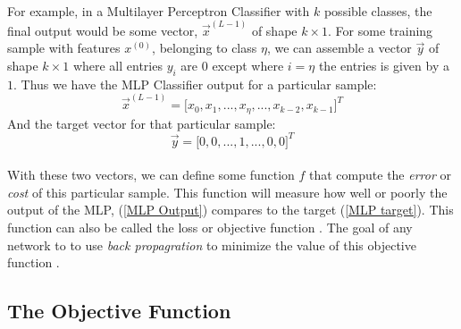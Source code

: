 \documentclass[12pt,letterpaper]{article}
\begin{document}
\paragraph*{}For example, in a Multilayer Perceptron Classifier with $k$ possible classes, the final output would be some vector, $\vec{x}^{(L-1)}$ of shape $k \times 1$. For some training sample with features $x^{(0)}$, belonging to class $\eta$, we can assemble a vector $\vec{y}$ of shape $k \times 1$ where all entries $y_i$ are $0$ except where $i = \eta$ the entries is given by a $1$. Thus we have the MLP Classifier output for a particular sample:
\begin{equation}
\label{MLP Output}
\vec{x}^{(L-1)} = \big[ x_0 , x_1 , ... , x_\eta , ... , 
x_{k-2} , x_{k-1} \big]^T
\end{equation}
And the target vector for that particular sample:
\begin{equation}
\label{MLP target}
\vec{y} = \big[ 0, 0 , ... , 1 , ... , 0 , 0 \big]^T
\end{equation}
\paragraph*{}With these two vectors, we can define some function $f$ that compute the \textit{error} or \textit{cost} of this particular sample. This function will measure how well or poorly the output of the MLP, (\ref{MLP Output}) compares to the target (\ref{MLP target}). This function can also be called the loss or objective function \cite{James}. The goal of any network to to use \textit{back propagration} to minimize the value of this objective function \cite{Geron}.


\subsection{The Objective Function}
\end{document}
